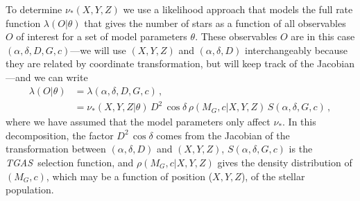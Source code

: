 \documentclass[12pt,preprint]{aastex}
\newcommand{\dens}{\ensuremath{\nu_*}}
\newcommand{\tgas}{\emph{TGAS}}
\newcommand{\ra}{\ensuremath{\alpha}}
\newcommand{\dec}{\ensuremath{\delta}}
\begin{document}
To determine $\dens(X,Y,Z)$ we use a likelihood approach that models
the full rate function $\lambda(O|\theta)$ that gives the number of
stars as a function of all observables $O$ of interest for a set of
model parameters $\theta$. These observables $O$ are in this case
$(\ra,\dec,D,G,c)$---we will use $(X,Y,Z)$ and $(\ra,\dec,D)$
interchangeably because they are related by coordinate transformation,
but will keep track of the Jacobian---and we can write
\begin{equation}
\begin{split}
  \lambda(O|\theta) & = \lambda(\ra,\dec,D,G,c)\,,\\
  &  = \dens(X,Y,Z|\theta)\,D^2\,\cos \dec\,\rho(M_G,c|X,Y,Z)\,S(\ra,\dec,G,c)\,,
\end{split}
\end{equation}
where we have assumed that the model parameters only affect
$\dens$. In this decomposition, the factor $D^2\,\cos \dec$ comes from
the Jacobian of the transformation between $(\ra,\dec,D)$ and
$(X,Y,Z)$, $S(\ra,\dec,G,c)$ is the \tgas\ selection function, and
$\rho(M_G,c|X,Y,Z)$ gives the density distribution of $(M_G,c)$, which
may be a function of position ($X,Y,Z$), of the stellar population. 
\end{document}

